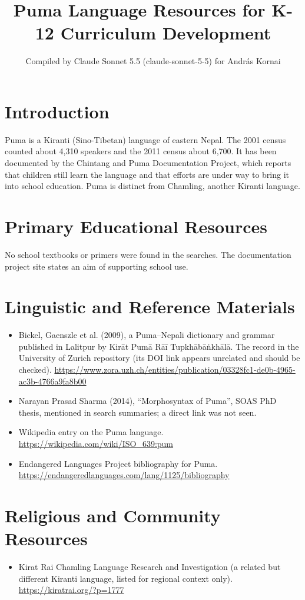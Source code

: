 \documentclass[12pt]{article}
\title{Puma Language Resources for K-12 Curriculum Development}
\author{Compiled by Claude Sonnet 5.5 (claude-sonnet-5-5) for Andr\'as Kornai}
\date{}
\begin{document}
\maketitle

\section{Introduction}
Puma is a Kiranti (Sino-Tibetan) language of eastern Nepal. The 2001 census counted about 4,310 speakers and the 2011 census about 6,700. It has been documented by the Chintang and Puma Documentation Project, which reports that children still learn the language and that efforts are under way to bring it into school education. Puma is distinct from Chamling, another Kiranti language.

\section{Primary Educational Resources}
No school textbooks or primers were found in the searches. The documentation project site states an aim of supporting school use.

\section{Linguistic and Reference Materials}
\begin{itemize}
\item Bickel, Gaenszle et al. (2009), a Puma--Nepali dictionary and grammar published in Lalitpur by Kir\=at Pum\=a R\=a\=i Tupkh\=ab\=a\.nkh\=al\=a. The record in the University of Zurich repository (its DOI link appears unrelated and should be checked). \url{https://www.zora.uzh.ch/entities/publication/03328fc1-de0b-4965-ac3b-4766a9fa8b00}
\item Narayan Prasad Sharma (2014), ``Morphosyntax of Puma'', SOAS PhD thesis, mentioned in search summaries; a direct link was not seen.
\item Wikipedia entry on the Puma language. \url{https://wikipedia.com/wiki/ISO_639:pum}
\item Endangered Languages Project bibliography for Puma. \url{https://endangeredlanguages.com/lang/1125/bibliography}
\end{itemize}

\section{Religious and Community Resources}
\begin{itemize}
\item Kirat Rai Chamling Language Research and Investigation (a related but different Kiranti language, listed for regional context only). \url{https://kiratrai.org/?p=1777}
\end{itemize}
\end{document}
